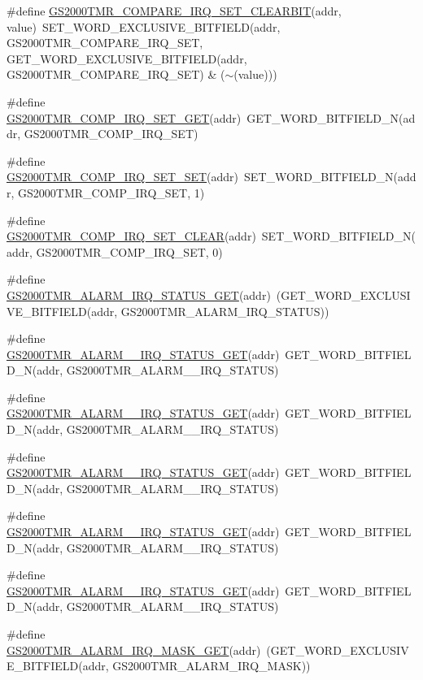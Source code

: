 \begin{DoxyCompactItemize}
\item 
\#define \hyperlink{a00555_a200976b4cfb2b17863b6a768071345dc}{GS2000TMR\_\-COMPARE\_\-IRQ\_\-SET\_\-CLEARBIT}(addr, value)~SET\_\-WORD\_\-EXCLUSIVE\_\-BITFIELD(addr, GS2000TMR\_\-COMPARE\_\-IRQ\_\-SET, GET\_\-WORD\_\-EXCLUSIVE\_\-BITFIELD(addr, GS2000TMR\_\-COMPARE\_\-IRQ\_\-SET) \& ($\sim$(value)))
\item 
\#define \hyperlink{a00555_af3869f35db057459b8b8ee0cd2cb5ac0}{GS2000TMR\_\-COMP\_\-IRQ\_\-SET\_\-GET}(addr)~GET\_\-WORD\_\-BITFIELD\_\-N(addr, GS2000TMR\_\-COMP\_\-IRQ\_\-SET)
\item 
\#define \hyperlink{a00555_a7bf5920ba2d71e5e56803ce3e028db35}{GS2000TMR\_\-COMP\_\-IRQ\_\-SET\_\-SET}(addr)~SET\_\-WORD\_\-BITFIELD\_\-N(addr, GS2000TMR\_\-COMP\_\-IRQ\_\-SET, 1)
\item 
\#define \hyperlink{a00555_acffe0489a99b8124869d07352f890543}{GS2000TMR\_\-COMP\_\-IRQ\_\-SET\_\-CLEAR}(addr)~SET\_\-WORD\_\-BITFIELD\_\-N(addr, GS2000TMR\_\-COMP\_\-IRQ\_\-SET, 0)
\item 
\#define \hyperlink{a00555_a236827c008811427c22ac3ae1d41d687}{GS2000TMR\_\-ALARM\_\-IRQ\_\-STATUS\_\-GET}(addr)~(GET\_\-WORD\_\-EXCLUSIVE\_\-BITFIELD(addr, GS2000TMR\_\-ALARM\_\-IRQ\_\-STATUS))
\item 
\#define \hyperlink{a00555_a11f9420e6c0437608b17f26a91ccc059}{GS2000TMR\_\-ALARM\_\_\-IRQ\_\-STATUS\_\-GET}(addr)~GET\_\-WORD\_\-BITFIELD\_\-N(addr, GS2000TMR\_\-ALARM\_\_\-IRQ\_\-STATUS)
\item 
\#define \hyperlink{a00555_a22883bf7bca9e801ff2525bf288d61e9}{GS2000TMR\_\-ALARM\_\_\-IRQ\_\-STATUS\_\-GET}(addr)~GET\_\-WORD\_\-BITFIELD\_\-N(addr, GS2000TMR\_\-ALARM\_\_\-IRQ\_\-STATUS)
\item 
\#define \hyperlink{a00555_aef0c0bda2c9fadb8e69f6477dba7a45a}{GS2000TMR\_\-ALARM\_\_\-IRQ\_\-STATUS\_\-GET}(addr)~GET\_\-WORD\_\-BITFIELD\_\-N(addr, GS2000TMR\_\-ALARM\_\_\-IRQ\_\-STATUS)
\item 
\#define \hyperlink{a00555_a3053954b389c73531e447f46fb9f1888}{GS2000TMR\_\-ALARM\_\_\-IRQ\_\-STATUS\_\-GET}(addr)~GET\_\-WORD\_\-BITFIELD\_\-N(addr, GS2000TMR\_\-ALARM\_\_\-IRQ\_\-STATUS)
\item 
\#define \hyperlink{a00555_a42b8c433eaa29f4dcaba1218f649908f}{GS2000TMR\_\-ALARM\_\_\-IRQ\_\-STATUS\_\-GET}(addr)~GET\_\-WORD\_\-BITFIELD\_\-N(addr, GS2000TMR\_\-ALARM\_\_\-IRQ\_\-STATUS)
\item 
\#define \hyperlink{a00555_aed8d90891943e431fb745cb2e8cb14fd}{GS2000TMR\_\-ALARM\_\-IRQ\_\-MASK\_\-GET}(addr)~(GET\_\-WORD\_\-EXCLUSIVE\_\-BITFIELD(addr, GS2000TMR\_\-ALARM\_\-IRQ\_\-MASK))

\end{DoxyCompactItemize}
